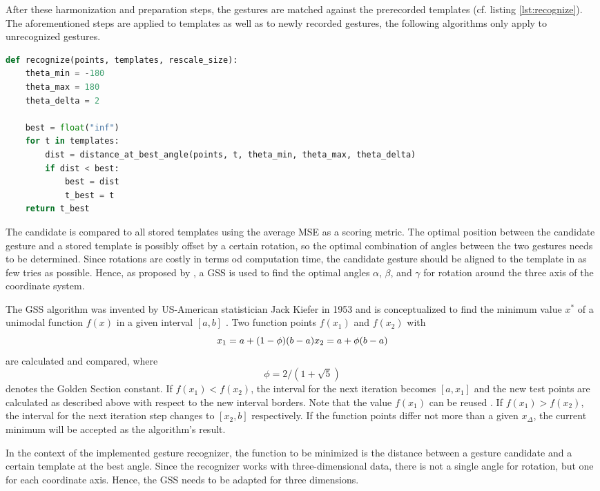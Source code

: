 After these harmonization and preparation steps, the gestures are matched against the prerecorded templates (cf. listing \ref{lst:recognize}). The aforementioned steps are applied to templates as well as to newly recorded gestures, the following algorithms only apply to unrecognized gestures.

\begin{lstlisting}[label=lst:recognize,language=python,frame=lt,caption=Matching candidate gesture against every template]
def recognize(points, templates, rescale_size):
	theta_min = -180
	theta_max = 180
	theta_delta = 2

	best = float("inf")
	for t in templates:
		dist = distance_at_best_angle(points, t, theta_min, theta_max, theta_delta)
		if dist < best:
			best = dist
			t_best = t
	return t_best
\end{lstlisting}

The candidate is compared to all stored templates using the average \ac{MSE} as a scoring metric. The optimal position between the candidate gesture and a stored template is possibly offset by a certain rotation, so the optimal combination of angles between the two gestures needs to be determined. Since rotations are costly in terms od computation time, the candidate gesture should be aligned to the template in as few tries as possible. Hence, as proposed by \cite{Kratz2010}, a \ac{GSS} is used to find the optimal angles $\alpha$, $\beta$, and $\gamma$ for rotation around the three axis of the coordinate system.

The \ac{GSS} algorithm was invented by US-American statistician Jack Kiefer in 1953  and is conceptualized to find the minimum value $x^*$ of a unimodal function $f(x)$ in a given interval $[a,b]$ \cite{Kiefer1953}. Two function points $f(x_1)$ and $f(x_2)$ with 
\[ x_1=a+(1-\phi)(b-a) \\
x_2=a+\phi(b-a) \]
are calculated and compared, where 
\[\phi=2/(1+\sqrt{5})\]
denotes the Golden Section constant. If $f(x_1) < f(x_2)$, the interval for the next iteration becomes $[a,x_1]$ and the new test points are calculated as described above with respect to the new interval borders. Note that the value $f(x_1)$ can be reused \cite{chang2009n}. If $f(x_1) > f(x_2)$, the interval for the next iteration step changes to $[x_2, b]$ respectively. If the function points differ not more than a given $x_\Delta$, the current minimum will be accepted as the algorithm's result.

In the context of the implemented gesture recognizer, the function to be minimized is the distance between a gesture candidate and a certain template at the best angle. Since the recognizer works with three-dimensional data, there is not a single angle for rotation, but one for each coordinate axis. Hence, the \ac{GSS} needs to be adapted for three dimensions.

